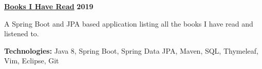%
    \headerrow
        {\textbf{\href{https://github.com/johatfie/books_i_have_read}{Books I Have Read}}}
        {\textbf{2019}}
    \vspace{-1.2em}
    \begin{itemize*}
        \item A Spring Boot and JPA based application listing all the books I have read and listened to.
    \end{itemize*}

    \vspace{-0.4em}
    \hspace{1.0em}
        {\textbf{Technologies:} Java 8, Spring Boot, Spring Data JPA, Maven, SQL, Thymeleaf, Vim, Eclipse, Git}


